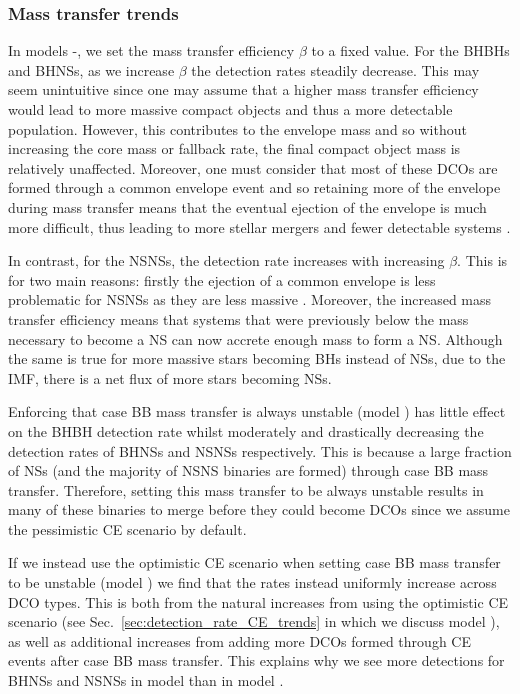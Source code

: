 \subsubsection{Mass transfer trends}

In models \modBetaLow{}-\modBetaHigh{}, we set the mass transfer efficiency $\beta$ to a fixed value. For the BHBHs and BHNSs, as we increase $\beta$ the detection rates steadily decrease. This may seem unintuitive since one may assume that a higher mass transfer efficiency would lead to more massive compact objects and thus a more detectable population. However, this contributes to the envelope mass and so without increasing the core mass or fallback rate, the final compact object mass is relatively unaffected. Moreover, one must consider that most of these DCOs are formed through a common envelope event and so retaining more of the envelope during mass transfer means that the eventual ejection of the envelope is much more difficult, thus leading to more stellar mergers and fewer detectable systems \citep[e.g.][]{Kruckow+2018}.

In contrast, for the NSNSs, the detection rate increases with increasing $\beta$. This is for two main reasons: firstly the ejection of a common envelope is less problematic for NSNSs as they are less massive \citep[e.g.][]{Kruckow+2018}. Moreover, the increased mass transfer efficiency means that systems that were previously below the mass necessary to become a NS can now accrete enough mass to form a NS. Although the same is true for more massive stars becoming BHs instead of NSs, due to the IMF, there is a net flux of more stars becoming NSs.

Enforcing that case BB mass transfer is always unstable (model \modCaseBB{}) has little effect on the BHBH detection rate whilst moderately and drastically decreasing the detection rates of BHNSs and NSNSs respectively. This is because a large fraction of NSs (and the majority of NSNS binaries are formed) through case BB mass transfer. Therefore, setting this mass transfer to be always unstable results in many of these binaries to merge before they could become DCOs since we assume the pessimistic CE scenario by default.

If we instead use the optimistic CE scenario when setting case BB mass transfer to be unstable (model \modCaseBBOpt{}) we find that the rates instead uniformly increase across DCO types. This is both from the natural increases from using the optimistic CE scenario (see Sec.~\ref{sec:detection_rate_CE_trends} in which we discuss model \modOpt{}), as well as additional increases from adding more DCOs formed through CE events after case BB mass transfer. This explains why we see more detections for BHNSs and NSNSs in model \modCaseBBOpt{} than in model \modOpt{}.

